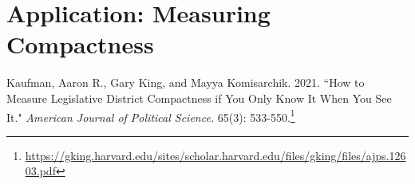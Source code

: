 \documentclass[10pt]{article}
\begin{document}
	
	\section{Application: Measuring Compactness}
	
	Kaufman, Aaron R., Gary King, and Mayya Komisarchik. 2021. ``How to Measure Legislative District Compactness if You Only Know It When You See It." \textit{American Journal of Political Science.} 65(3): 533-550.\footnote{\url{https://gking.harvard.edu/sites/scholar.harvard.edu/files/gking/files/ajps.12603.pdf}}
	
\end{document}
